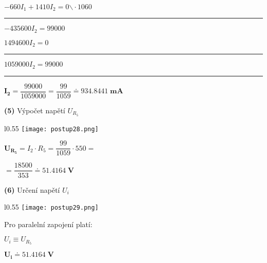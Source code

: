\documentclass[a4paper,12pt]{article}
\begin{document}
\hspace{3em}$-660I_1+1410I_2=0$\hspace{1.5em}$\backslash\cdot 1060$\par
\vspace{-8pt}\hspace{3em}\noindent\rule{7cm}{0.5pt}\par
\hspace{4em}$-435600I_2=99000$\par
\hspace{4em}$1494600I_2=0$\par
\vspace{-8pt}\hspace{4em}\noindent\rule{7cm}{0.5pt}\par
\hspace{5em}$1059000I_2=99000$\par
\vspace{-8pt}\hspace{5em}\noindent\rule{7cm}{0.5pt}\par
\hspace{6em}$\mathbf{I_2}=\dfrac{99000}{1059000}=\dfrac{99}{1059}\doteq \mathbf{ 934.8441 \;\si{\milli\ampere}}$\par\vspace{1em}
\hspace{1em}\textbf{(5)} Výpočet napětí $U_{R_5}$\par\vspace{0.8em}
\begin{wrapfigure}{l}{0.55\textwidth}
\vspace{-50pt}
\texttt{[image: postup28.png]}
\vspace{-80pt}
\end{wrapfigure}
\vspace{25pt}
\hspace{1em}$\mathbf{U_{R_5}}=I_2\cdot R_5=\dfrac{99}{1059}\cdot 550=$\par
\hspace{1em}$=\dfrac{18500}{353}\doteq \mathbf{ 51.4164 \;\si{\volt}}$\par\vspace{4em}
\hspace{1em}\textbf{(6)} Určení napětí $U_i$\par\vspace{0.8em}
\begin{wrapfigure}{l}{0.55\textwidth}
\vspace{-56pt}
\texttt{[image: postup29.png]}
\vspace{-75pt}
\end{wrapfigure}
\vspace{25pt}
\hspace{1em}Pro paralelní zapojení platí:\par
\hspace{1em}$U_i\equiv U_{R_5}$\par
\hspace{1em}$\mathbf{U_i\doteq 51.4164\;\si{\volt}}$\newpage
\end{document}
